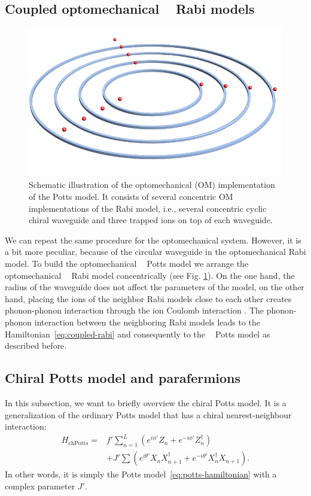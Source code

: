 \documentclass[reprint, aps, prx, amsmath, amssymb, longbibliography, superscriptaddress]{revtex4-2}
\DeclareMathOperator{\Zthree}{\mathbb{Z}_3}
\begin{document}
\subsection{Coupled optomechanical \texorpdfstring{$\Zthree$}{Z3} Rabi models}

\begin{figure}[t]
    \centering
    \includegraphics[width = 0.8 \linewidth]{pics/optomechanical_Potts_pic.pdf}
    \caption{Schematic illustration of the optomechanical (OM) implementation of the Potts model. It consists of several concentric OM implementations of the Rabi model, i.e., several concentric cyclic chiral waveguide and three trapped ions on top of each waveguide.}
    \label{fig:optomechanical-potts}
\end{figure}

We can repeat the same procedure for the optomechanical system. However, it is a bit more peculiar, because of the circular waveguide in the optomechanical Rabi model. To build the optomechanical $\Zthree$ Potts model we arrange the optomechanical $\Zthree$ Rabi model concentrically (see Fig. \ref{fig:optomechanical-potts}). On the one hand, the radius of the waveguide does not affect the parameters of the model, on the other hand, placing the ions of the neighbor Rabi models close to each other creates phonon-phonon interaction through the ion Coulomb interaction \cite{schneider_experimental_2012,timm_dynamics_2023}. The phonon-phonon interaction between the neighboring Rabi models leads to the Hamiltonian~\eqref{eq:coupled-rabi} and consequently to the $\Zthree$ Potts model as described before.


\subsection{Chiral Potts model and parafermions}


In this subsection, we want to briefly overview the chiral Potts model. It is a generalization of the ordinary Potts model that has a chiral nearest-neighbour interaction:
\begin{equation}
\label{eq:chiral-potts-hamiltonian}
\begin{aligned}
    H_{\text{chPotts}} = &f'\sum_{n=1}^L (e^{i\phi'} Z_n + e^{-i\phi'} Z_n^{\dagger}) \\
    &+ J' \sum (e^{i\theta'} X_n X_{n+1}^{\dagger} + e^{-i\theta'} X_n^{\dagger} X_{n+1}).
\end{aligned}
\end{equation}
In other words, it is simply the Potts model~\eqref{eq:potts-hamiltonian} with a complex parameter $J'$. 
\end{document}
